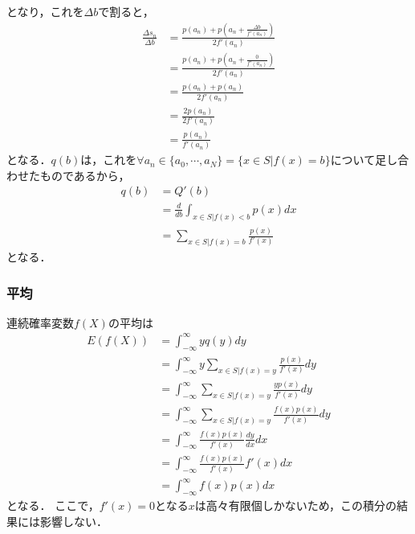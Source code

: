 \documentclass[dvipdfmx]{jsarticle}
\begin{document}
となり，これを$\Delta b$で割ると，
 \begin{align}
  \frac{\Delta s_n}{\Delta b}&=\frac{p\left(a_n\right)+p\left(a_n+\frac{\Delta b}{f'\left(a_n\right)}\right)}{2f'\left(a_n\right)}\nonumber\\
  &=\frac{p\left(a_n\right)+p\left(a_n+\frac{0}{f'\left(a_n\right)}\right)}{2f'\left(a_n\right)}\nonumber\\
  &=\frac{p\left(a_n\right)+p\left(a_n\right)}{2f'\left(a_n\right)}\nonumber\\
  &=\frac{2p\left(a_n\right)}{2f'\left(a_n\right)}\nonumber\\
  &=\frac{p\left(a_n\right)}{f'\left(a_n\right)}
 \end{align}
となる．$q\left(b\right)$は，これを$\forall a_n\in\{a_0,\cdots,a_N\}=\{x\in S|f\left(x\right)=b\}$について足し合わせたものであるから，
 \begin{align}
  q\left(b\right)&=Q'\left(b\right)\nonumber\\
  &=\frac{d}{db}\int_{x\in S|f\left(x\right)<b}p\left(x\right)dx\nonumber\\
  &=\sum_{x\in S|f\left(x\right)=b}\frac{p\left(x\right)}{f'\left(x\right)}
 \end{align}
となる．
 \subsubsection{平均}
連続確率変数$f\left(X\right)$の平均は
 \begin{align}
  E\left(f\left(X\right)\right)&=\int_{-\infty}^\infty yq\left(y\right)dy\nonumber\\
  &=\int_{-\infty}^\infty y\sum_{x\in S|f\left(x\right)=y}\frac{p\left(x\right)}{f'\left(x\right)}dy\nonumber\\
  &=\int_{-\infty}^\infty\sum_{x\in S|f\left(x\right)=y}\frac{yp\left(x\right)}{f'\left(x\right)}dy\nonumber\\
  &=\int_{-\infty}^\infty\sum_{x\in S|f\left(x\right)=y}\frac{f\left(x\right)p\left(x\right)}{f'\left(x\right)}dy\nonumber\\
  &=\int_{-\infty}^\infty\frac{f\left(x\right)p\left(x\right)}{f'\left(x\right)}\frac{dy}{dx}dx\nonumber\\
  &=\int_{-\infty}^\infty\frac{f\left(x\right)p\left(x\right)}{f'\left(x\right)}f'\left(x\right)dx\nonumber\\
  &=\int_{-\infty}^\infty f\left(x\right)p\left(x\right)dx
 \end{align}
となる．
ここで，$f'\left(x\right)=0$となる$x$は高々有限個しかないため，この積分の結果には影響しない．
\end{document}
